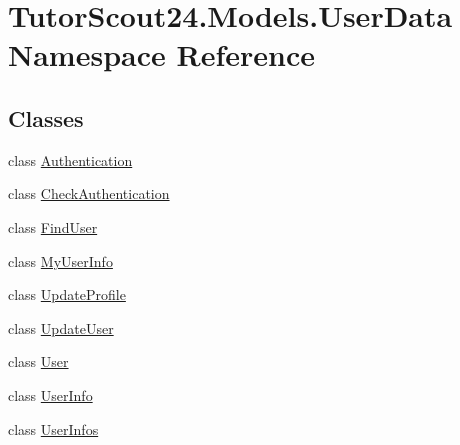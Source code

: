 \hypertarget{namespace_tutor_scout24_1_1_models_1_1_user_data}{}\section{Tutor\+Scout24.\+Models.\+User\+Data Namespace Reference}
\label{namespace_tutor_scout24_1_1_models_1_1_user_data}
\subsection*{Classes}
\begin{DoxyCompactItemize}
\item 
class \mbox{\hyperlink{class_tutor_scout24_1_1_models_1_1_user_data_1_1_authentication}{Authentication}}
\item 
class \mbox{\hyperlink{class_tutor_scout24_1_1_models_1_1_user_data_1_1_check_authentication}{Check\+Authentication}}
\item 
class \mbox{\hyperlink{class_tutor_scout24_1_1_models_1_1_user_data_1_1_find_user}{Find\+User}}
\item 
class \mbox{\hyperlink{class_tutor_scout24_1_1_models_1_1_user_data_1_1_my_user_info}{My\+User\+Info}}
\item 
class \mbox{\hyperlink{class_tutor_scout24_1_1_models_1_1_user_data_1_1_update_profile}{Update\+Profile}}
\item 
class \mbox{\hyperlink{class_tutor_scout24_1_1_models_1_1_user_data_1_1_update_user}{Update\+User}}
\item 
class \mbox{\hyperlink{class_tutor_scout24_1_1_models_1_1_user_data_1_1_user}{User}}
\item 
class \mbox{\hyperlink{class_tutor_scout24_1_1_models_1_1_user_data_1_1_user_info}{User\+Info}}
\item 
class \mbox{\hyperlink{class_tutor_scout24_1_1_models_1_1_user_data_1_1_user_infos}{User\+Infos}}
\end{DoxyCompactItemize}

